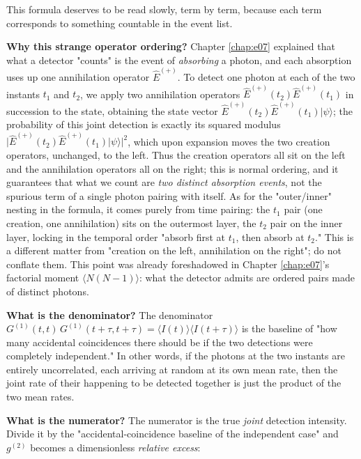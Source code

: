 This formula deserves to be read slowly, term by term, because each term corresponds to something countable in the event list.

\textbf{Why this strange operator ordering?} Chapter \ref{chap:e07} explained that what a detector "counts" is the event of \emph{absorbing} a photon, and each absorption uses up one annihilation operator \(\hat E^{(+)}\). To detect one photon at each of the two instants \(t_1\) and \(t_2\), we apply two annihilation operators \(\hat E^{(+)}(t_2)\hat E^{(+)}(t_1)\) in succession to the state, obtaining the state vector \(\hat E^{(+)}(t_2)\hat E^{(+)}(t_1)|\psi\rangle\); the probability of this joint detection is exactly its squared modulus \(\big|\hat E^{(+)}(t_2)\hat E^{(+)}(t_1)|\psi\rangle\big|^2\), which upon expansion moves the two creation operators, unchanged, to the left. Thus the creation operators all sit on the left and the annihilation operators all on the right; this is normal ordering, and it guarantees that what we count are \emph{two distinct absorption events}, not the spurious term of a single photon pairing with itself. As for the "outer/inner" nesting in the formula, it comes purely from time pairing: the \(t_1\) pair (one creation, one annihilation) sits on the outermost layer, the \(t_2\) pair on the inner layer, locking in the temporal order "absorb first at \(t_1\), then absorb at \(t_2\)." This is a different matter from "creation on the left, annihilation on the right"; do not conflate them. This point was already foreshadowed in Chapter \ref{chap:e07}'s factorial moment \(\langle N(N-1)\rangle\): what the detector admits are ordered pairs made of distinct photons.

\textbf{What is the denominator?} The denominator \(G^{(1)}(t,t)\,G^{(1)}(t+\tau,t+\tau)=\langle I(t)\rangle\langle I(t+\tau)\rangle\) is the baseline of "how many accidental coincidences there should be if the two detections were completely independent." In other words, if the photons at the two instants are entirely uncorrelated, each arriving at random at its own mean rate, then the joint rate of their happening to be detected together is just the product of the two mean rates.

\textbf{What is the numerator?} The numerator is the true \emph{joint} detection intensity. Divide it by the "accidental-coincidence baseline of the independent case" and \(g^{(2)}\) becomes a dimensionless \emph{relative excess}:


